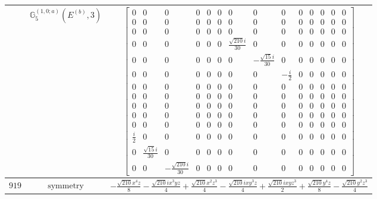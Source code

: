 \documentclass[fleqn,8pt,landscape]{jsarticle}
\begin{document}
\begin{longtable}{ccc}
$  $ & $ \mathbb{G}_{5}^{(1,0;a)}(E^{(b)},3) $ & $ \begin{bmatrix} 0 & 0 & 0 & 0 & 0 & 0 & 0 & 0 & 0 & 0 & 0 & 0 & 0 & 0 \\ 0 & 0 & 0 & 0 & 0 & 0 & 0 & 0 & 0 & 0 & 0 & 0 & 0 & 0 \\ 0 & 0 & 0 & 0 & 0 & 0 & 0 & 0 & 0 & 0 & 0 & 0 & 0 & 0 \\ 0 & 0 & 0 & 0 & 0 & 0 & \frac{\sqrt{210} i}{30} & 0 & 0 & 0 & 0 & 0 & 0 & 0 \\ 0 & 0 & 0 & 0 & 0 & 0 & 0 & - \frac{\sqrt{15} i}{30} & 0 & 0 & 0 & 0 & 0 & 0 \\ 0 & 0 & 0 & 0 & 0 & 0 & 0 & 0 & - \frac{i}{2} & 0 & 0 & 0 & 0 & 0 \\ 0 & 0 & 0 & 0 & 0 & 0 & 0 & 0 & 0 & 0 & 0 & 0 & 0 & 0 \\ 0 & 0 & 0 & 0 & 0 & 0 & 0 & 0 & 0 & 0 & 0 & 0 & 0 & 0 \\ 0 & 0 & 0 & 0 & 0 & 0 & 0 & 0 & 0 & 0 & 0 & 0 & 0 & 0 \\ 0 & 0 & 0 & 0 & 0 & 0 & 0 & 0 & 0 & 0 & 0 & 0 & 0 & 0 \\ 0 & 0 & 0 & 0 & 0 & 0 & 0 & 0 & 0 & 0 & 0 & 0 & 0 & 0 \\ \frac{i}{2} & 0 & 0 & 0 & 0 & 0 & 0 & 0 & 0 & 0 & 0 & 0 & 0 & 0 \\ 0 & \frac{\sqrt{15} i}{30} & 0 & 0 & 0 & 0 & 0 & 0 & 0 & 0 & 0 & 0 & 0 & 0 \\ 0 & 0 & - \frac{\sqrt{210} i}{30} & 0 & 0 & 0 & 0 & 0 & 0 & 0 & 0 & 0 & 0 & 0 \end{bmatrix} $ \\ \hline
$ 919 $ & $ \text{symmetry} $ & $ - \frac{\sqrt{210} x^{4} z}{8} - \frac{\sqrt{210} i x^{3} y z}{4} + \frac{\sqrt{210} x^{2} z^{3}}{4} - \frac{\sqrt{210} i x y^{3} z}{4} + \frac{\sqrt{210} i x y z^{3}}{2} + \frac{\sqrt{210} y^{4} z}{8} - \frac{\sqrt{210} y^{2} z^{3}}{4} $ \\

\end{longtable}
\end{document}
